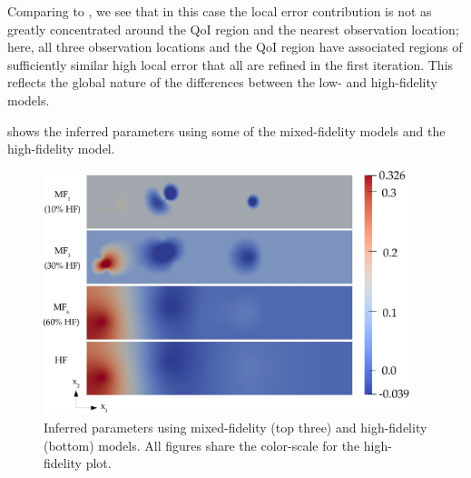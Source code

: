 \documentclass[review,sort&compress]{elsarticle}
\theoremstyle{plain} %
\theoremstyle{definition} %
\begin{document}
%
Comparing to , we see that in this case the local error contribution is not as greatly concentrated around the QoI region and the nearest observation location; here, all three observation locations and the QoI region have associated regions of sufficiently similar high local error that all are refined in the first iteration. This reflects the global nature of the differences between the low- and high-fidelity models. 

 shows the inferred parameters using some of the mixed-fidelity models and the high-fidelity model.
%
\begin{figure}[htbp]
\centering
\includegraphics[width=0.95\textwidth]{svf/svf_param_fused.pdf}
\caption{Inferred parameters using mixed-fidelity (top three) and high-fidelity (bottom) models. All figures share the color-scale for the high-fidelity plot.}
\label{fig:svfRefParams}
\end{figure}
\end{document}
